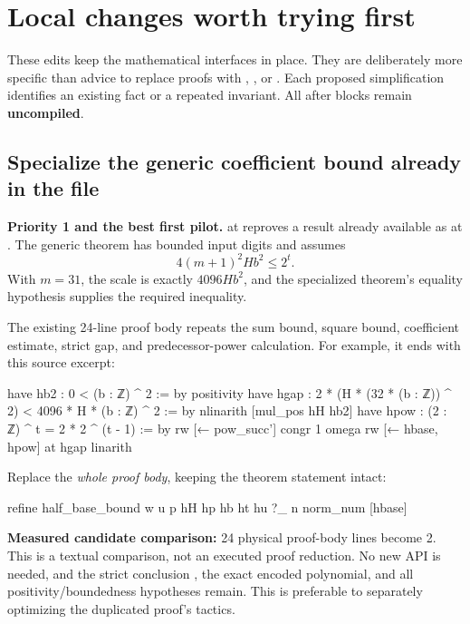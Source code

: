 \majorbreak
\section{Local changes worth trying first}
\label{sec:local}

These edits keep the mathematical interfaces in place. They are deliberately
more specific than advice to replace proofs with , ,
or . Each proposed simplification identifies an existing fact
or a repeated invariant. All after blocks remain \textbf{uncompiled}.

\subsection{Specialize the generic coefficient bound already in the file}
\label{sec:halfbase}

\textbf{Priority 1 and the best first pilot.}
 at
 reproves a result already
available as  at
. The generic theorem has
 bounded input digits and assumes
\[
 4(m+1)^2Hb^2\le 2^t.
\]
With $m=31$, the scale is exactly $4096Hb^2$, and the specialized theorem's
equality hypothesis supplies the required inequality.

The existing 24-line proof body repeats the sum bound, square bound,
coefficient estimate, strict gap, and predecessor-power calculation. For
example, it ends with this source excerpt:

\begin{Lean}
  have hb2 : 0 < (b : ℤ) ^ 2 := by positivity
  have hgap : 2 * (H * (32 * (b : ℤ)) ^ 2) <
      4096 * H * (b : ℤ) ^ 2 := by
    nlinarith [mul_pos hH hb2]
  have hpow : (2 : ℤ) ^ t = 2 * 2 ^ (t - 1) := by
    rw [← pow_succ']
    congr 1
    omega
  rw [← hbase, hpow] at hgap
  linarith
\end{Lean}

Replace the \emph{whole proof body}, keeping the theorem statement intact:

\begin{Lean}
  refine half_base_bound w u p hH hp hb ht hu ?_ n
  norm_num [hbase]
\end{Lean}

\textbf{Measured candidate comparison:} 24 physical proof-body lines become
2. This is a textual comparison, not an executed proof reduction. No new
API is needed, and the strict conclusion , the exact
encoded polynomial, and all positivity/boundedness hypotheses remain.
This is preferable to separately optimizing the duplicated proof's tactics.

